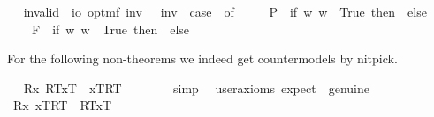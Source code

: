 \begin{isabellebody}
\ \isamarkupfalse%
\ invalid\ {\isacharcolon}{\isacharcolon}\ {\isachardoublequoteopen}io\ opt{\isasymRightarrow}mf{\isachardoublequoteclose}\ {\isacharparenleft}{\isachardoublequoteopen}{\isacharbrackleft}{\isacharunderscore}{\isacharbrackright}\isactrlsup i\isactrlsup n\isactrlsup v{\isachardoublequoteclose}\ {\isacharbrackleft}{}{\isacharbrackright}{\isacharparenright}\ \ {\isachardoublequoteopen}{\isacharbrackleft}{\isasymphi}{\isacharbrackright}\isactrlsup i\isactrlsup n\isactrlsup v\ {\isasymequiv}\ case\ {\isasymphi}\ of\ \isanewline
\ \ \ \ P{\isacharparenleft}{\isasympsi}{\isacharparenright}\ {\isasymRightarrow}\ if\ {\isasymforall}w{\isachardot}{\isasymnot}{\isacharparenleft}{\isasympsi}\ w{\isacharparenright}\ {\isasymlongleftrightarrow}\ True\ then\ {\isasymtop}\ else\ {\isasymbottom}\ {\isacharbar}\ \isanewline
\ \ \ \ F{\isacharparenleft}{\isasympsi}{\isacharparenright}\ {\isasymRightarrow}\ if\ {\isasymforall}w{\isachardot}{\isasymnot}{\isacharparenleft}{\isasympsi}\ w{\isacharparenright}\ {\isasymlongleftrightarrow}\ True\ then\ {\isasymtop}\ else\ {\isasymbottom}\ {\isacharbar}\ \isanewline
\ \ \ \ {\isacharunderscore}\ {\isasymRightarrow}\ {\isacharasterisk}{\isachardoublequoteclose}%
\isamarkuptrue%
%
\isamarkuptrue%
%
\begin{isamarkuptext}%
For the following non-theorems we indeed get countermodels by nitpick.%
\end{isamarkuptext}\isamarkuptrue%
\ \isamarkupfalse%
\ {\isachardoublequoteopen}{\isacharbrackleft}{\isacharparenleft}\isactrlbold {\isasymforall}R{\isachardot}\isactrlbold {\isasymforall}x{\isachardot}\ {\isasymlparr}R\isactrlsup T{\isacharcomma}x\isactrlsup T{\isasymrparr}\ \isactrlbold {\isasymrightarrow}\ {\isasymlbrace}x\isactrlsup T{\isacharcomma}R\isactrlsup T{\isasymrbrace}{\isacharparenright}{\isacharbrackright}\ {\isacharequal}\ {\isasymtop}{\isachardoublequoteclose}\ \isanewline
%
\isadelimproof
\ \ \ %
\endisadelimproof
%
\isatagproof
{}\isamarkupfalse%
\ simp\ \isamarkupfalse%
\ {\isacharbrackleft}user{\isacharunderscore}axioms{\isacharcomma}\ expect\ {\isacharequal}\ genuine{\isacharbrackright}\ \ \isamarkupfalse%
\ %
%
\endisatagproof
{\isafoldproof}%
%
\isadelimproof
\isanewline
%
\endisadelimproof
\ \isamarkupfalse%
\ {\isachardoublequoteopen}{\isacharbrackleft}{\isacharparenleft}\isactrlbold {\isasymforall}R{\isachardot}\isactrlbold {\isasymforall}x{\isachardot}\ {\isasymlbrace}x\isactrlsup T{\isacharcomma}R\isactrlsup T{\isasymrbrace}\ \isactrlbold {\isasymrightarrow}\ {\isasymlparr}R\isactrlsup T{\isacharcomma}x\isactrlsup T{\isasymrparr}{\isacharparenright}{\isacharbrackright}\ {\isacharequal}\ {\isasymtop}{\isachardoublequoteclose}\ \isanewline

\end{isabellebody}
